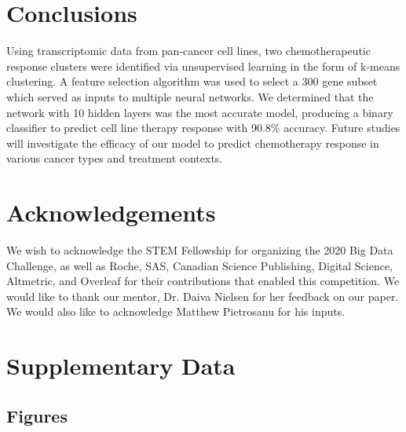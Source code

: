 \documentclass[10pt, letterpaper, twocolumn]{article}
\begin{document}
\section{Conclusions}
Using transcriptomic data from pan-cancer cell lines, two chemotherapeutic response clusters were identified via unsupervised learning in the form of k-means clustering. A feature selection algorithm was used to select a 300 gene subset which served as inputs to multiple neural networks. We determined that the network with 10 hidden layers was the most accurate model, producing a binary classifier to predict cell line therapy response with 90.8\% accuracy. Future studies will investigate the efficacy of our model to predict chemotherapy response in various cancer types and treatment contexts.


\section*{Acknowledgements}
We wish to acknowledge the STEM Fellowship for organizing the 2020 Big Data Challenge, as well as Roche, SAS, Canadian Science Publishing, Digital Science, Altmetric, and Overleaf for their contributions that enabled this competition. We would like to thank our mentor, Dr. Daiva Nielsen for her feedback on our paper. We would also like to acknowledge Matthew Pietrosanu for his inputs.




\clearpage

\onecolumn
\renewcommand{\thepage}{S\arabic{page}}
\renewcommand{\thesection}{S\arabic{section}}
\renewcommand{\thetable}{S\arabic{table}}
\renewcommand{\thefigure}{S\arabic{figure}}

\section{Supplementary Data}
\subsection{Figures}
\end{document}
